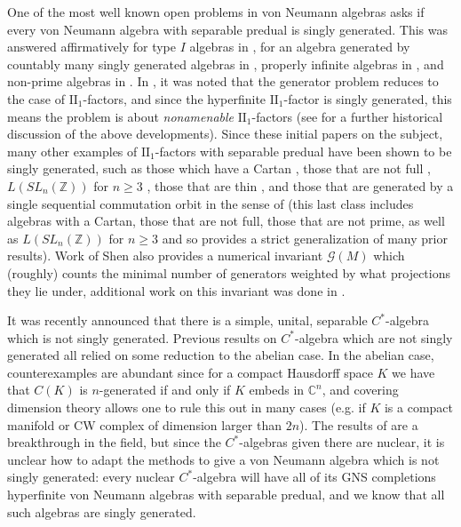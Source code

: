 \documentclass[10pt]{amsart}
\theoremstyle{definition}
\numberwithin{equation}{section}
\newcommand{\bC}{{\mathbb C}}
\newcommand{\bZ}{{\mathbb Z}}
\newcommand{\cG}{{\mathcal G}}
\begin{document}
One of the most well known open problems in von Neumann algebras asks if every von Neumann algebra with separable predual is singly generated. This was answered affirmatively for type $I$ algebras in \cite{PearcySG}, for an algebra generated by countably many singly generated algebras in \cite{SSGen}, properly infinite algebras in \cite{WogenGen}, and non-prime algebras in \cite{BehnckeSG}. In \cite{WilligGen}, it was  noted that the generator problem reduces to the case of $\textrm{II}_{1}$-factors, and since the hyperfinite $\textrm{II}_{1}$-factor is singly generated, this means the problem is about \emph{nonamenable} $\textrm{II}_{1}$-factors (see \cite{CardinalInvariantsSherman} for a further historical discussion of the above developments). Since these initial papers on the subject, many other examples of $\textrm{II}_{1}$-factors with separable predual have been shown to be  singly generated, such as those which have a Cartan \cite{SorinCarSG}, those that are not full \cite{GePopaSG}, $L(SL_{n}(\bZ))$ for $n\geq 3$ \cite{GeShenGen}, those that are thin \cite{GePopaSG}, and those that are generated by a single sequential commutation orbit \cite{InternalSeqComm} in the sense of \cite{SeqCommutation} (this last class includes algebras with a Cartan, those that are not full, those that are not prime, as well as $L(SL_{n}(\bZ))$ for $n\geq 3$ and so provides a strict generalization of many prior results). Work of Shen \cite{ShenSingleGen} also provides a numerical invariant $\cG(M)$ which (roughly) counts the minimal number of generators weighted by what projections they lie under, additional work on this invariant was done in \cite{DSSW}.


It was recently announced \cite{elliott2026simpleseparablecalgebrasingly} that there is a simple, unital, separable $C^{*}$-algebra which is not singly generated. Previous results on $C^{*}$-algebra which are not singly generated all relied on some reduction to the abelian case. In the abelian case, counterexamples are abundant since for a compact Hausdorff space $K$ we have that $C(K)$ is $n$-generated if and only if $K$ embeds in $\bC^{n}$, and covering dimension theory allows one to rule this out in many cases (e.g. if $K$ is a compact manifold or CW complex of dimension larger than $2n$). The results of \cite{elliott2026simpleseparablecalgebrasingly} are a breakthrough in the field, but since the $C^{*}$-algebras given there are nuclear, it is unclear how to adapt the methods to give a von Neumann algebra which is not singly generated: every nuclear $C^{*}$-algebra will have all of its GNS completions hyperfinite von Neumann algebras with separable predual, and we know that all such algebras are singly generated. 
\end{document}
